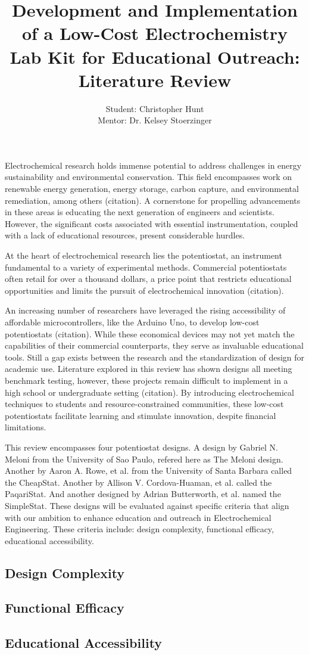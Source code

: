 \documentclass{article}
\title{\textcolor{mycolor}{\textbf{{\huge Development and Implementation of a Low-Cost Electrochemistry Lab Kit for Educational Outreach: Literature Review}}}}
\author{Student: Christopher Hunt \\ Mentor: Dr. Kelsey Stoerzinger}
\date{}
\begin{document}
\pagestyle{fancy}
\fancyhf{}
\rfoot{}
\rhead{\thepage}
\maketitle
Electrochemical research holds immense potential to address challenges in energy sustainability and environmental conservation. This field encompasses work on renewable energy generation, energy storage, carbon capture, and environmental remediation, among others (citation). A cornerstone for propelling advancements in these areas is educating the next generation of engineers and scientists. However, the significant costs associated with essential instrumentation, coupled with a lack of educational resources, present considerable hurdles.

At the heart of electrochemical research lies the potentiostat, an instrument fundamental to a variety of experimental methods. Commercial potentiostats often retail for over a thousand dollars, a price point that restricts educational opportunities and limits the pursuit of electrochemical innovation (citation).

An increasing number of researchers have leveraged the rising accessibility of affordable microcontrollers, like the Arduino Uno, to develop low-cost potentiostats (citation). While these economical devices may not yet match the capabilities of their commercial counterparts, they serve as invaluable educational tools. Still a gap exists between the research and the standardization of design for academic use. Literature explored in this review has shown designs all meeting benchmark testing, however, these projects remain difficult to implement in a high school or undergraduate setting (citation). By introducing electrochemical techniques to students and resource-constrained communities, these low-cost potentiostats facilitate learning and stimulate innovation, despite financial limitations.

This review encompasses four potentiostat designs. A design by Gabriel N. Meloni from the University of Sao Paulo, refered here as The Meloni design. Another by Aaron A. Rowe, et al. from the University of Santa Barbara called the CheapStat. Another by Allison V. Cordova-Huaman, et al. called the PaqariStat. And another designed by Adrian Butterworth, et al. named the SimpleStat. These designs will be evaluated against specific criteria that align with our ambition to enhance education and outreach in Electrochemical Engineering. These criteria include: design complexity, functional efficacy, educational accessibility. 
 
\subsection*{Design Complexity}

\subsection*{Functional Efficacy}
\subsection*{Educational Accessibility}
\end{document}
